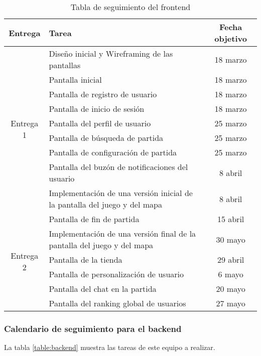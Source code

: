 \documentclass[11pt, a4paper, titlepage]{article}
\begin{document}
\renewcommand{\arraystretch}{1.3}
\begin{table}[hbt!]
\begin{adjustbox}{minipage=18cm, center}
\begin{tabularx}{\textwidth}{|c|X|c| }
\hline
Entrega & Tarea & Fecha objetivo\\ \hline
\multirow{9}{*}{Entrega 1} & Diseño inicial y Wireframing de las pantallas & 18 marzo \\\cline{2-3}
& Pantalla inicial & 18 marzo\\\cline{2-3}
& Pantalla de registro de usuario & 18 marzo \\\cline{2-3}
& Pantalla de inicio de sesión &  18 marzo \\\cline{2-3}
& Pantalla del perfil de usuario &  25 marzo \\\cline{2-3}
& Pantalla de búsqueda de partida &  25 marzo \\\cline{2-3}
& Pantalla de configuración de partida & 25 marzo \\\cline{2-3}
& Pantalla del buzón de notificaciones del usuario &  8 abril \\\cline{2-3}
& Implementación de una versión inicial de la pantalla del juego y del mapa & 8 abril
\\\hline
\multirow{6}{*}{Entrega 2} & Pantalla de fin de partida & 15 abril \\\cline{2-3}
& Implementación de una versión final de la pantalla del juego y del mapa & 30 mayo\\\cline{2-3}
& Pantalla de la tienda & 29 abril \\\cline{2-3}
& Pantalla de personalización de usuario & 6 mayo\\\cline{2-3}
& Pantalla del chat en la partida & 20 mayo \\\cline{2-3}
& Pantalla del ranking global de usuarios& 27 mayo \\\cline{2-3}
\hline
\end{tabularx}
\caption{Tabla de seguimiento del frontend}
\label{table:frontend}
\end{adjustbox}
\end{table}
\FloatBarrier    

\newpage

\subsubsection{Calendario de seguimiento para el backend}
 La tabla \ref{table:backend} muestra las tareas de este equipo a realizar. \newline
\end{document}

